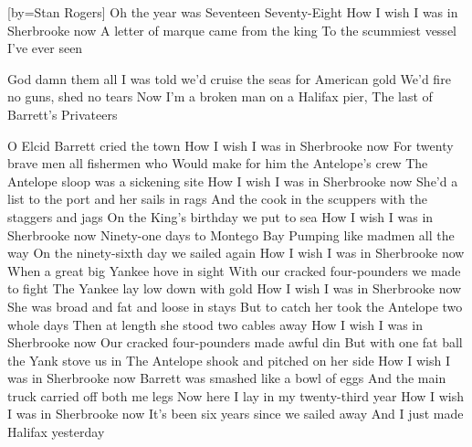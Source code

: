 [by={Stan Rogers}]
\beginverse\singlespacing
Oh the year was Seventeen Seventy-Eight
How I wish I was in Sherbrooke now
A letter of marque came from the king
To the scummiest vessel I've ever seen
\endverse

\beginchorus \singlespacing
God damn them all
I was told we'd cruise the seas for American gold
We'd fire no guns, shed no tears
Now I'm a broken man on a Halifax pier,
The last of Barrett's Privateers
\endchorus

\beginverse\singlespacing
O Elcid Barrett cried the town
How I wish I was in Sherbrooke now
For twenty brave men all fishermen who
Would make for him the Antelope's crew
\endverse
{}
\beginverse\singlespacing
The Antelope sloop was a sickening site
How I wish I was in Sherbrooke now
She'd a list to the port and her sails in rags
And the cook in the scuppers with the staggers and jags
\endverse
{}
\beginverse\singlespacing
On the King's birthday we put to sea
How I wish I was in Sherbrooke now
Ninety-one days to Montego Bay
Pumping like madmen all the way
\endverse
{}
\beginverse\singlespacing
On the ninety-sixth day we sailed again
How I wish I was in Sherbrooke now
When a great big Yankee hove in sight
With our cracked four-pounders we made to fight
\endverse
{}
\beginverse\singlespacing
The Yankee lay low down with gold
How I wish I was in Sherbrooke now
She was broad and fat and loose in stays
But to catch her took the Antelope two whole days
\endverse
{}
\beginverse\singlespacing
Then at length she stood two cables away
How I wish I was in Sherbrooke now
Our cracked four-pounders made awful din
But with one fat ball the Yank stove us in
\endverse
{}
\beginverse\singlespacing
The Antelope shook and pitched on her side
How I wish I was in Sherbrooke now
Barrett was smashed like a bowl of eggs
And the main truck carried off both me legs
\endverse
{}
\beginverse\singlespacing
Now here I lay in my twenty-third year
How I wish I was in Sherbrooke now
It's been six years since we sailed away
And I just made Halifax yesterday
\endverse
{}
\endsong
